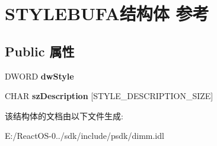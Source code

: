 \hypertarget{struct_s_t_y_l_e_b_u_f_a}{}\section{S\+T\+Y\+L\+E\+B\+U\+F\+A结构体 参考}
\label{struct_s_t_y_l_e_b_u_f_a}
\subsection*{Public 属性}
\begin{DoxyCompactItemize}
\item 
\mbox{\label{struct_s_t_y_l_e_b_u_f_a_ac3f68428330146c23514f55d14c76a99}} 
D\+W\+O\+RD {\bfseries dw\+Style}
\item 
\mbox{\label{struct_s_t_y_l_e_b_u_f_a_ad5f6c7e107eb3d31113c6e8b169fb154}} 
C\+H\+AR {\bfseries sz\+Description} \mbox{[}S\+T\+Y\+L\+E\+\_\+\+D\+E\+S\+C\+R\+I\+P\+T\+I\+O\+N\+\_\+\+S\+I\+ZE\mbox{]}
\end{DoxyCompactItemize}


该结构体的文档由以下文件生成\+:\begin{DoxyCompactItemize}
\item 
E\+:/\+React\+O\+S-\/0../sdk/include/psdk/dimm.\+idl\end{DoxyCompactItemize}

